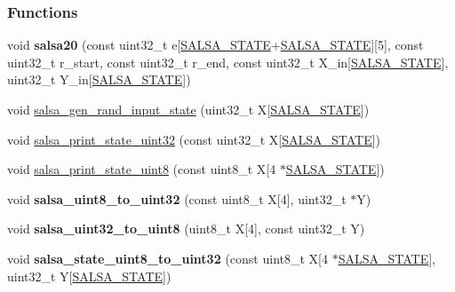 \subsubsection*{\-Functions}
\begin{DoxyCompactItemize}
\item 
\hypertarget{salsa_8hh_a075c010da91440a44535de65daeddf05}{void {\bfseries salsa20} (const uint32\-\_\-t e\mbox{[}\hyperlink{salsa_8hh_a642186115ff24eb2f42febb3ccaa093f}{\-S\-A\-L\-S\-A\-\_\-\-S\-T\-A\-T\-E}+\hyperlink{salsa_8hh_a642186115ff24eb2f42febb3ccaa093f}{\-S\-A\-L\-S\-A\-\_\-\-S\-T\-A\-T\-E}\mbox{]}\mbox{[}5\mbox{]}, const uint32\-\_\-t r\-\_\-start, const uint32\-\_\-t r\-\_\-end, const uint32\-\_\-t \-X\-\_\-in\mbox{[}\hyperlink{salsa_8hh_a642186115ff24eb2f42febb3ccaa093f}{\-S\-A\-L\-S\-A\-\_\-\-S\-T\-A\-T\-E}\mbox{]}, uint32\-\_\-t \-Y\-\_\-in\mbox{[}\hyperlink{salsa_8hh_a642186115ff24eb2f42febb3ccaa093f}{\-S\-A\-L\-S\-A\-\_\-\-S\-T\-A\-T\-E}\mbox{]})}\label{salsa_8hh_a075c010da91440a44535de65daeddf05}

\item 
void \hyperlink{salsa_8hh_aa499af8d8d1dc95497226dd8949bbe79}{salsa\-\_\-gen\-\_\-rand\-\_\-input\-\_\-state} (uint32\-\_\-t \-X\mbox{[}\hyperlink{salsa_8hh_a642186115ff24eb2f42febb3ccaa093f}{\-S\-A\-L\-S\-A\-\_\-\-S\-T\-A\-T\-E}\mbox{]})
\item 
void \hyperlink{salsa_8hh_ae95929608c990de68d87198dc8bfe36c}{salsa\-\_\-print\-\_\-state\-\_\-uint32} (const uint32\-\_\-t \-X\mbox{[}\hyperlink{salsa_8hh_a642186115ff24eb2f42febb3ccaa093f}{\-S\-A\-L\-S\-A\-\_\-\-S\-T\-A\-T\-E}\mbox{]})
\item 
void \hyperlink{salsa_8hh_a5df83dc88782e57a1288c66047d67aa5}{salsa\-\_\-print\-\_\-state\-\_\-uint8} (const uint8\-\_\-t \-X\mbox{[}4 $\ast$\hyperlink{salsa_8hh_a642186115ff24eb2f42febb3ccaa093f}{\-S\-A\-L\-S\-A\-\_\-\-S\-T\-A\-T\-E}\mbox{]})
\item 
\hypertarget{salsa_8hh_aec235ccc18eea1de3674c3e8ba9e458e}{void {\bfseries salsa\-\_\-uint8\-\_\-to\-\_\-uint32} (const uint8\-\_\-t \-X\mbox{[}4\mbox{]}, uint32\-\_\-t $\ast$\-Y)}\label{salsa_8hh_aec235ccc18eea1de3674c3e8ba9e458e}

\item 
\hypertarget{salsa_8hh_a438585255c425543024693c96fd7134e}{void {\bfseries salsa\-\_\-uint32\-\_\-to\-\_\-uint8} (uint8\-\_\-t \-X\mbox{[}4\mbox{]}, const uint32\-\_\-t \-Y)}\label{salsa_8hh_a438585255c425543024693c96fd7134e}

\item 
\hypertarget{salsa_8hh_a30e43f0a4a7b3b29508a28d7c35bb56b}{void {\bfseries salsa\-\_\-state\-\_\-uint8\-\_\-to\-\_\-uint32} (const uint8\-\_\-t \-X\mbox{[}4 $\ast$\hyperlink{salsa_8hh_a642186115ff24eb2f42febb3ccaa093f}{\-S\-A\-L\-S\-A\-\_\-\-S\-T\-A\-T\-E}\mbox{]}, uint32\-\_\-t \-Y\mbox{[}\hyperlink{salsa_8hh_a642186115ff24eb2f42febb3ccaa093f}{\-S\-A\-L\-S\-A\-\_\-\-S\-T\-A\-T\-E}\mbox{]})}\label{salsa_8hh_a30e43f0a4a7b3b29508a28d7c35bb56b}


\end{DoxyCompactItemize}
